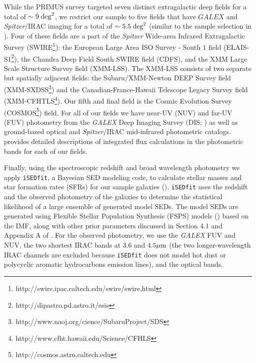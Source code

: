 \documentclass{emulateapj}
\begin{document}
While the PRIMUS survey targeted seven distinct extragalactic deep fields for a total of $\sim 9 \; \rm{deg}^2$, we restrict our sample to five fields that have $GALEX$ and {\em Spitzer}/IRAC imaging for a total of $\sim 5.5 \; \rm{deg}^2$ (similar to the sample selection in \citealt{Moustakas:2013aa}). Four of these fields are a part of the {\em Spitzer} Wide-area Infrared Extragalactic Survey (SWIRE\footnote{http://swire.ipac.caltech.edu/swire/swire.html}): the European Large Area ISO Survey - South $1$ field (ELAIS-S1\footnote{http://dipastro.pd.astro.it/esis}), the Chandra Deep Field South SWIRE field (CDFS), and the XMM Large Scale Structure Survey field (XMM-LSS). The XMM-LSS consists of two separate but spatially adjacent fields: the Subaru/XMM-Newton DEEP Survey field (XMM-SXDSS\footnote{http://www.naoj.org/cience/SubaruProject/SDS}) and the Canadian-France-Hawaii Telescope Legacy Survey field (XMM-CFHTLS\footnote{http://www.cfht.hawaii.edu/Science/CFHLS}). Our fifth and final field is the Cosmic Evolution Survey (COSMOS\footnote{http://cosmos.astro.caltech.edu}) field. For all of our fields we have near-UV (NUV) and far-UV (FUV) photometry from the {\em GALEX} Deep Imaging Survey (DIS; \citealt{Martin:2005aa, Morrissey:2005aa}) as well as ground-based optical and {\em Spitzer}/IRAC mid-infrared photometric catalogs. \cite{Moustakas:2013aa} provides detailed descriptions of integrated flux calculations in the photometric bands for each of our fields. 

Finally, using the spectroscopic redshift and broad wavelength photometry we apply \texttt{iSEDfit}, a Bayesian SED modeling code, to calculate stellar masses and star formation rates (SFRs) for our sample galaxies (\citealt{Moustakas:2013aa}). \texttt{iSEDfit} uses the redshift and the observed photometry of the galaxies to determine the statistical likelihood of a large ensemble of generated model SEDs. The model SEDs are generated using Flexible Stellar Population Synthesis (FSPS) models (\citealt{Conroy:2010aa}) based on the \cite{Chabrier:2003aa} IMF, along with other prior parameters discussed in Section 4.1 and Appendix A of \cite{Moustakas:2013aa}. For the observed photometry, we use the {\em GALEX} FUV and NUV, the two shortest IRAC bands at $3.6$ and $4.5 \mu \rm{m}$ (the two longer-wavelength IRAC channels are excluded because \texttt{iSEDfit} does not model hot dust or polycyclic aromatic hydrocarbons emission lines), and the optical bands. 

\end{document}
